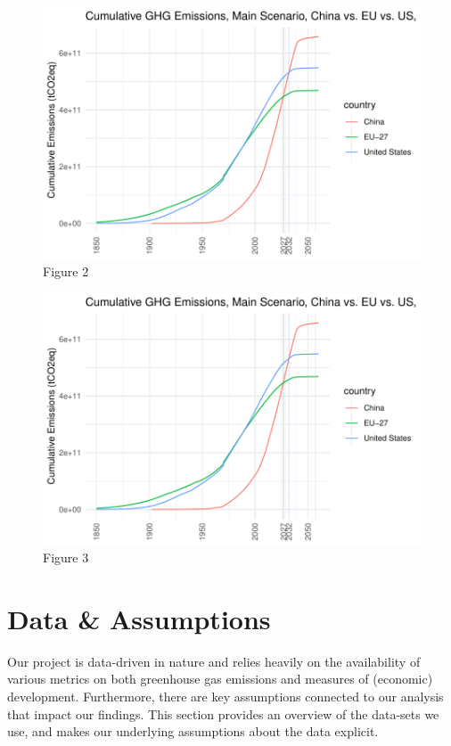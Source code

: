 \documentclass[
  12pt,
]{article}
\numberwithin{equation}{section}
\numberwithin{table}{section}
\numberwithin{figure}{section}
\begin{document}
\begin{figure}
\centering
\includegraphics{Paper_files/figure-latex/unnamed-chunk-2-1.pdf}
\caption{Figure 2}
\end{figure}

\begin{figure}
\centering
\includegraphics{Paper_files/figure-latex/unnamed-chunk-3-1.pdf}
\caption{Figure 3}
\end{figure}

\hypertarget{data-assumptions}{%
\section{Data \& Assumptions}\label{data-assumptions}}

Our project is data-driven in nature and relies heavily on the
availability of various metrics on both greenhouse gas emissions and
measures of (economic) development. Furthermore, there are key
assumptions connected to our analysis that impact our findings. This
section provides an overview of the data-sets we use, and makes our
underlying assumptions about the data explicit.
\end{document}
